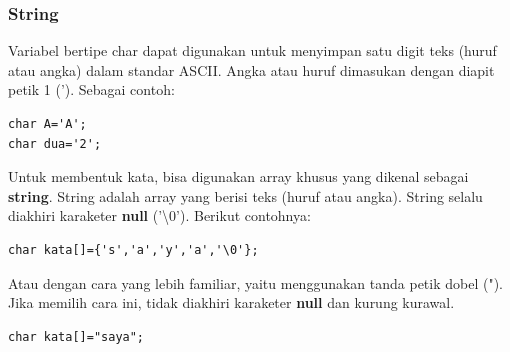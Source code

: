 \documentclass[12pt,]{article}
\begin{document}
	\subsubsection{String}
	
	Variabel bertipe char dapat digunakan untuk menyimpan satu digit teks (huruf atau angka) dalam standar ASCII.
	Angka atau huruf dimasukan dengan diapit petik 1 (').
	Sebagai contoh:
	\begin{verbatim}
char A='A';
char dua='2';
	\end{verbatim}
	
	Untuk membentuk kata, bisa digunakan array khusus yang dikenal sebagai \textbf{string}.
	String adalah array yang berisi teks (huruf atau angka).
	String selalu diakhiri karaketer \textbf{null} ('\textbackslash0').
	Berikut contohnya:
	\begin{verbatim}
char kata[]={'s','a','y','a','\0'};
	\end{verbatim}
	
	Atau dengan cara yang lebih familiar, yaitu menggunakan tanda petik dobel (").
	Jika memilih cara ini, tidak diakhiri karaketer \textbf{null} dan kurung kurawal.
	\begin{verbatim}
char kata[]="saya";
	\end{verbatim}
	
\end{document}
